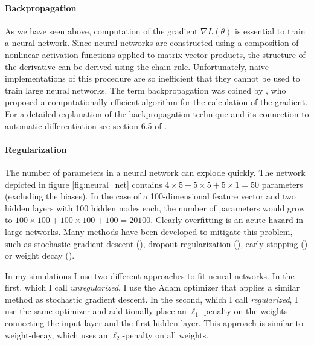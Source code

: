 \paragraph{Backpropagation}

As we have seen above, computation of the gradient $\nabla L(\theta)$ is essential to
train a neural network. Since neural networks are constructed using a composition of
nonlinear activation functions applied to matrix-vector products, the structure of the
derivative can be derived using the chain-rule. Unfortunately, naive implementations of
this procedure are so inefficient that they cannot be used to train large neural
networks. The term backpropagation was coined by \cite{Rumelhart.1986}, who proposed a
computationally efficient algorithm for the calculation of the gradient. For a detailed
explanation of the backpropagation technique and its connection to automatic
differentiation see section 6.5 of \cite{Goodfellow.2016}.

\paragraph{Regularization}

The number of parameters in a neural network can explode quickly. The network depicted
in figure \ref{fig:neural_net} contains $4 \times 5 + 5 \times 5 + 5 \times 1 = 50$
parameters (excluding the biases). In the case of a 100-dimensional feature vector and
two hidden layers with 100 hidden nodes each, the number of parameters would grow to
$100 \times 100 + 100 \times 100 + 100 = 20100$. Clearly overfitting is an acute hazard
in large networks. Many methods have been developed to mitigate this problem, such as
stochastic gradient descent (\cite{Ruppert.1985}), dropout regularization
(\cite{Srivastava.2014}), early stopping (\cite{Caruana.2000}) or weight decay
(\cite{Krogh.1991}).

In my simulations I use two different approaches to fit neural networks. In the first,
which I call \emph{unregularized}, I use the Adam optimizer that applies a similar
method as stochastic gradient descent. In the second, which I call \emph{regularized}, I
use the same optimizer and additionally place an $\ell_1$-penalty on the weights
connecting the input layer and the first hidden layer. This approach is similar to
weight-decay, which uses an $\ell_2$-penalty on all weights.
